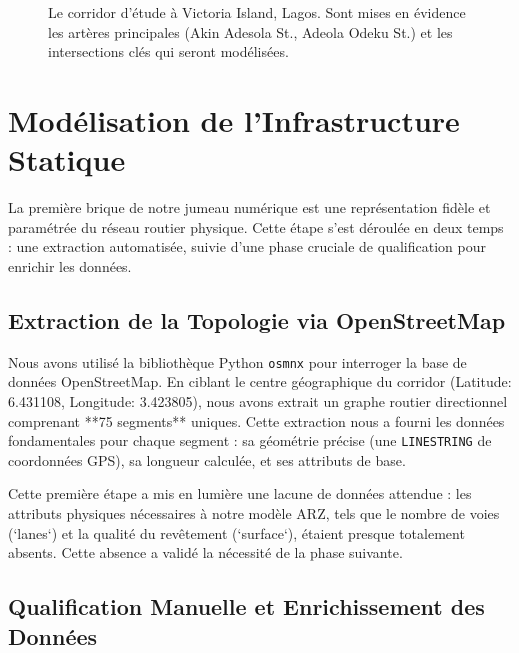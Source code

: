\begin{figure}[htbp]
    \centering
    \caption{Le corridor d'étude à Victoria Island, Lagos. Sont mises en évidence les artères principales (Akin Adesola St., Adeola Odeku St.) et les intersections clés qui seront modélisées.}
    \label{fig:carte_corridor_vi}
\end{figure}

\section{Modélisation de l'Infrastructure Statique}
\label{sec:infra_statique}

La première brique de notre jumeau numérique est une représentation fidèle et paramétrée du réseau routier physique. Cette étape s'est déroulée en deux temps : une extraction automatisée, suivie d'une phase cruciale de qualification pour enrichir les données.

\subsection{Extraction de la Topologie via OpenStreetMap}
\label{subsec:extraction_osm_static}

Nous avons utilisé la bibliothèque Python \texttt{osmnx} pour interroger la base de données OpenStreetMap. En ciblant le centre géographique du corridor (Latitude: 6.431108, Longitude: 3.423805), nous avons extrait un graphe routier directionnel comprenant **75 segments** uniques. Cette extraction nous a fourni les données fondamentales pour chaque segment : sa géométrie précise (une \texttt{LINESTRING} de coordonnées GPS), sa longueur calculée, et ses attributs de base.

Cette première étape a mis en lumière une lacune de données attendue : les attributs physiques nécessaires à notre modèle ARZ, tels que le nombre de voies (`lanes`) et la qualité du revêtement (`surface`), étaient presque totalement absents. Cette absence a validé la nécessité de la phase suivante.

\subsection{Qualification Manuelle et Enrichissement des Données}
\label{subsec:qualification_manuelle_static}

